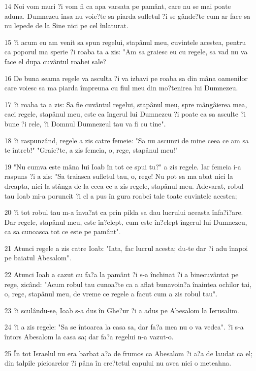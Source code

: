 \par 14 Noi vom muri ?i vom fi ca apa varsata pe pamânt, care nu se mai poate aduna. Dumnezeu însa nu voie?te sa piarda sufletul ?i se gânde?te cum ar face sa nu lepede de la Sine nici pe cel înlaturat.
\par 15 ?i acum eu am venit sa spun regelui, stapânul meu, cuvintele acestea, pentru ca poporul ma sperie ?i roaba ta a zis: "Am sa graiesc eu cu regele, sa vad nu va face el dupa cuvântul roabei sale?
\par 16 De buna seama regele va asculta ?i va izbavi pe roaba sa din mâna oamenilor care voiesc sa ma piarda împreuna cu fiul meu din mo?tenirea lui Dumnezeu.
\par 17 ?i roaba ta a zis: Sa fie cuvântul regelui, stapânul meu, spre mângâierea mea, caci regele, stapânul meu, este ca îngerul lui Dumnezeu ?i poate ca sa asculte ?i bune ?i rele, ?i Domnul Dumnezeul tau va fi cu tine".
\par 18 ?i raspunzând, regele a zis catre femeie: "Sa nu ascunzi de mine ceea ce am sa te întreb!" "Graie?te, a zis femeia, o, rege, stapânul meu!"
\par 19 "Nu cumva este mâna lui Ioab în tot ce spui tu?" a zis regele. Iar femeia i-a raspuns ?i a zis: "Sa traiasca sufletul tau, o, rege! Nu pot sa ma abat nici la dreapta, nici la stânga de la ceea ce a zis regele, stapânul meu. Adevarat, robul tau Ioab mi-a poruncit ?i el a pus în gura roabei tale toate cuvintele acestea;
\par 20 ?i tot robul tau m-a înva?at ca prin pilda sa dau lucrului aceasta înfa?i?are. Dar regele, stapânul meu, este în?elept, cum este în?elept îngerul lui Dumnezeu, ca sa cunoasca tot ce este pe pamânt".
\par 21 Atunci regele a zis catre Ioab: "Iata, fac lucrul acesta; du-te dar ?i adu înapoi pe baiatul Abesalom".
\par 22 Atunci Ioab a cazut cu fa?a la pamânt ?i s-a închinat ?i a binecuvântat pe rege, zicând: "Acum robul tau cunoa?te ca a aflat bunavoin?a înaintea ochilor tai, o, rege, stapânul meu, de vreme ce regele a facut cum a zis robul tau".
\par 23 ?i sculându-se, Ioab s-a dus în Ghe?ur ?i a adus pe Abesalom la Ierusalim.
\par 24 ?i a zis regele: "Sa se întoarca la casa sa, dar fa?a mea nu o va vedea". ?i s-a întors Abesalom la casa sa; dar fa?a regelui n-a vazut-o.
\par 25 În tot Israelul nu era barbat a?a de frumos ca Abesalom ?i a?a de laudat ca el; din talpile picioarelor ?i pâna în cre?tetul capului nu avea nici o meteahna.
